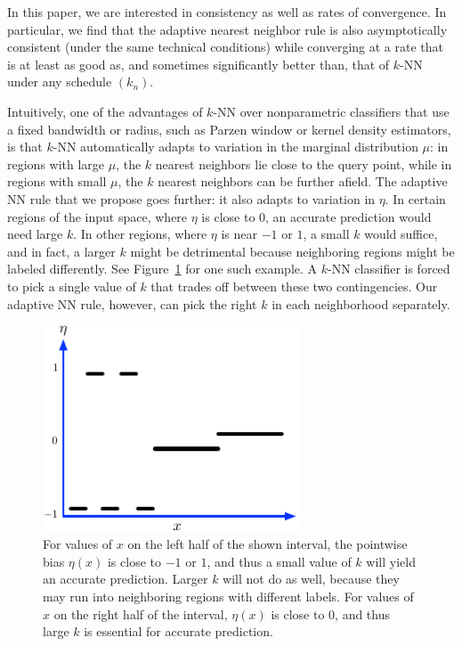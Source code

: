\documentclass{article}
\begin{document}
In this paper, we are interested in consistency as well as rates of
convergence. In particular, we find that the adaptive nearest neighbor
rule is also asymptotically consistent (under the same technical
conditions) while converging at a rate that is at least as good as,
and sometimes significantly better than, that of $k$-NN
under any schedule $(k_n)$.

Intuitively, one of the advantages of $k$-NN over nonparametric
classifiers that use a fixed bandwidth or radius, such as Parzen
window or kernel density estimators, is that $k$-NN automatically
adapts to variation in the marginal distribution $\mu$: in regions
with large $\mu$, the $k$ nearest neighbors lie close to the query
point, while in regions with small $\mu$, the $k$ nearest neighbors
can be further afield. The adaptive NN rule that we propose goes
further: it also adapts to variation in $\eta$. In certain regions of
the input space, where $\eta$ is close to $0$, an accurate
prediction would need large $k$. In other regions, where $\eta$ is
near $-1$ or $1$, a small $k$ would suffice, and in fact, a larger $k$
might be detrimental because neighboring regions might be labeled
differently. See Figure~\ref{fig:rationale} for one such example. A
$k$-NN classifier is forced to pick a single value of $k$ that trades
off between these two contingencies. Our adaptive NN rule, however,
can pick the right $k$ in each neighborhood separately.

\begin{figure}
\begin{center}
\includegraphics[width=3in]{adaptive-rationale.pdf}
\end{center}
\caption{For values of $x$ on the left half of the shown interval, the
  pointwise bias $\eta(x)$ is close to $-1$ or $1$, and thus a small value of $k$ will yield an accurate prediction. Larger $k$ will not do as well, because they may run into neighboring regions with different labels. For values of $x$ on the right half of the interval, $\eta(x)$ is close to $0$, and thus large $k$ is essential for accurate prediction.}
\label{fig:rationale}
\end{figure}
\end{document}
